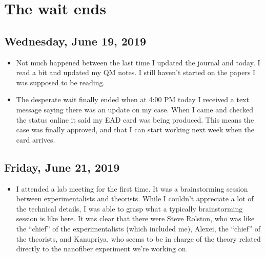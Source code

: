 \documentclass{book}
\theoremstyle{definition}
\begin{document}
\chapter{The wait ends}
\section*{Wednesday, June 19, 2019}
\begin{itemize}
	\item Not much happened between the last time I updated the journal and today. I read a bit and updated my QM notes. I still haven't started on the papers I was {supposed} to be reading.
	
	\item The desperate wait finally ended when at 4:00 PM today I received a text message saying there was an update on my case. When I came and checked the status online it said my EAD card was being produced. This means the case was finally approved, and that I can start working next week when the card arrives.
	
\end{itemize}

\section*{Friday, June 21, 2019}
\begin{itemize}
	\item I attended a lab meeting for the first time. It was a brainstorming session between experimentalists and theorists. While I couldn't appreciate a lot of the technical details, I was able to grasp what a typically brainstorming session is like here. It was clear that there were Steve Rolston, who was like the ``chief'' of the experimentalists (which included me), Alexei, the ``chief'' of the theorists, and Kanupriya, who seems to be in charge of the theory related directly to the nanofiber experiment we're working on. 
\end{itemize}
\end{document}
